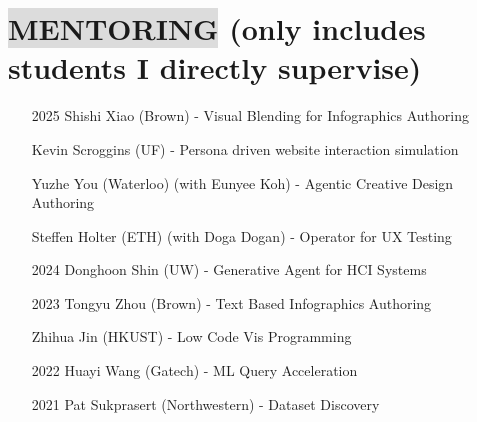 \section*{
    \colorbox{gainsboro}{MENTORING}  {\small \normalfont (only includes students I directly supervise)}
}
\begin{itemize}[leftmargin=16.5mm,labelsep=9mm,noitemsep]
    \item[2025] Shishi Xiao (Brown) - Visual Blending for Infographics Authoring
    \item[] Kevin Scroggins (UF) - Persona driven website interaction simulation
    \item[] Yuzhe You (Waterloo) (with Eunyee Koh) - Agentic Creative Design Authoring
    \item[] Steffen Holter (ETH) (with Doga Dogan) - Operator for UX Testing
    \item[2024] Donghoon Shin (UW) - Generative Agent for HCI Systems
    \item[2023] Tongyu Zhou (Brown) - Text Based Infographics Authoring
    \item[] Zhihua Jin (HKUST) - Low Code Vis Programming
    \item[2022] Huayi Wang (Gatech) - ML Query Acceleration
    \item[2021] Pat Sukprasert (Northwestern) - Dataset Discovery
\end{itemize}